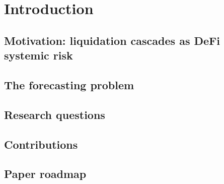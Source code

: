 \section{Introduction}\label{sec:intro}

\subsection{Motivation: liquidation cascades as DeFi systemic risk}\label{sec:intro-motivation}

\subsection{The forecasting problem}\label{sec:intro-problem}

\subsection{Research questions}\label{sec:intro-rqs}

\subsection{Contributions}\label{sec:intro-contributions}

\subsection{Paper roadmap}\label{sec:intro-roadmap}
